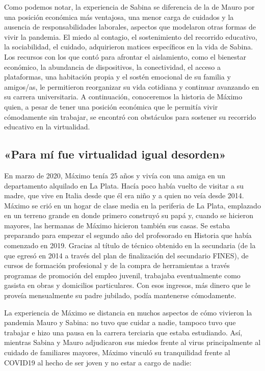 \begin{refsection}
\begin{gbcita}
\end{gbcita}

Como podemos notar, la experiencia de Sabina se diferencia de la de Mauro por una posición económica más ventajosa, una menor carga de cuidados y la ausencia de responsabilidades laborales, aspectos que modelaron otras formas de vivir la pandemia. El miedo al contagio, el sostenimiento del recorrido educativo, la sociabilidad, el cuidado, adquirieron matices específicos en la vida de Sabina. Los recursos con los que contó para afrontar el aislamiento, como el bienestar económico, la abundancia de dispositivos, la conectividad, el acceso a plataformas, una habitación propia y el sostén emocional de su familia y amigos/as, le permitieron reorganizar su vida cotidiana y continuar avanzando en su carrera universitaria. A continuación, conoceremos la historia de Máximo quien, a pesar de tener una posición económica que le permitía vivir cómodamente sin trabajar, se encontró con obstáculos para sostener su recorrido educativo en la virtualidad.


\subsection[«Para mí fue virtualidad igual desorden»]{«Para mí fue virtualidad igual desorden»}
\label{cap-27.para-mi-fue-virtualidad-igual-desorden}
En marzo de 2020, Máximo tenía 25 años y vivía con una amiga en un departamento alquilado en La Plata. Hacía poco había vuelto de visitar a su madre, que vive en Italia desde que él era niño y a quien no veía desde 2014. Máximo se crió en un hogar de clase media \protect\parencite{4185-CLEMENCEAU2016} en la periferia de La Plata, emplazado en un terreno grande en donde primero construyó su papá y, cuando se hicieron mayores, las hermanas de Máximo hicieron también sus casas. Se estaba preparando para empezar el segundo año del profesorado en Historia que había comenzado en 2019. Gracias al título de técnico obtenido en la secundaria (de la que egresó en 2014 a través del plan de finalización del secundario FINES), de cursos de formación profesional y de la compra de herramientas a través programas de promoción del empleo juvenil, trabajaba eventualmente como gasista en obras y domicilios particulares. Con esos ingresos, más dinero que le proveía mensualmente su padre jubilado, podía mantenerse cómodamente.

La experiencia de Máximo se distancia en muchos aspectos de cómo vivieron la pandemia Mauro y Sabina: no tuvo que cuidar a nadie, tampoco tuvo que trabajar e hizo una pausa en la carrera terciaria que estaba estudiando. Así, mientras Sabina y Mauro adjudicaron sus miedos frente al virus principalmente al cuidado de familiares mayores, Máximo vinculó su tranquilidad frente al COVID19 al hecho de ser joven y no estar a cargo de nadie:



\end{refsection}
